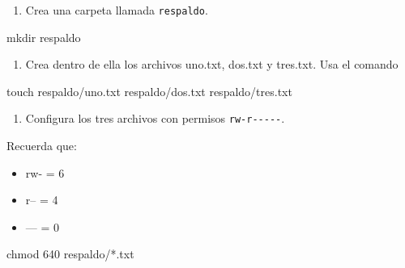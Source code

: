 \documentclass[
  spanish,
  12pt,
  letterpaper,
  DIV=11,
  numbers=noendperiod]{scrreprt}
\newenvironment{Shaded}{\begin{snugshade}}{\end{snugshade}}
\newcommand{\FunctionTok}[1]{\textcolor[rgb]{0.28,0.35,0.67}{#1}}
\newcommand{\NormalTok}[1]{\textcolor[rgb]{0.00,0.23,0.31}{#1}}
\newcommand{\PreprocessorTok}[1]{\textcolor[rgb]{0.68,0.00,0.00}{#1}}
\providecommand{\tightlist}{%
  \setlength{\itemsep}{0pt}\setlength{\parskip}{0pt}}
\begin{document}
\begin{tcolorbox}[enhanced jigsaw, arc=.35mm, bottomrule=.15mm, bottomtitle=1mm, breakable, colback=white, colbacktitle=quarto-callout-note-color!10!white, colframe=quarto-callout-note-color-frame, coltitle=black, left=2mm, leftrule=.75mm, opacityback=0, opacitybacktitle=0.6, rightrule=.15mm, title=\textcolor{quarto-callout-note-color}{\faInfo}\hspace{0.5em}{Ejercicio 2}, titlerule=0mm, toprule=.15mm, toptitle=1mm]

\begin{enumerate}
\def\labelenumi{\arabic{enumi}.}
\tightlist
\item
  Crea una carpeta llamada \texttt{respaldo}.
\end{enumerate}

\begin{Shaded}
\begin{Highlighting}[]
\FunctionTok{mkdir}\NormalTok{ respaldo}
\end{Highlighting}
\end{Shaded}

\begin{enumerate}
\def\labelenumi{\arabic{enumi}.}
\setcounter{enumi}{1}
\tightlist
\item
  Crea dentro de ella los archivos uno.txt, dos.txt y tres.txt. Usa el
  comando
\end{enumerate}

\begin{Shaded}
\begin{Highlighting}[]
\FunctionTok{touch}\NormalTok{ respaldo/uno.txt respaldo/dos.txt respaldo/tres.txt}
\end{Highlighting}
\end{Shaded}

\begin{enumerate}
\def\labelenumi{\arabic{enumi}.}
\setcounter{enumi}{2}
\tightlist
\item
  Configura los tres archivos con permisos \texttt{rw-r-\/-\/-\/-\/-}.
\end{enumerate}

Recuerda que:

\begin{itemize}
\tightlist
\item
  rw- = 6
\item
  r-- = 4
\item
  --- = 0
\end{itemize}

\begin{Shaded}
\begin{Highlighting}[]
\FunctionTok{chmod}\NormalTok{ 640 respaldo/}\PreprocessorTok{*}\NormalTok{.txt}
\end{Highlighting}
\end{Shaded}


\end{tcolorbox}
\end{document}
